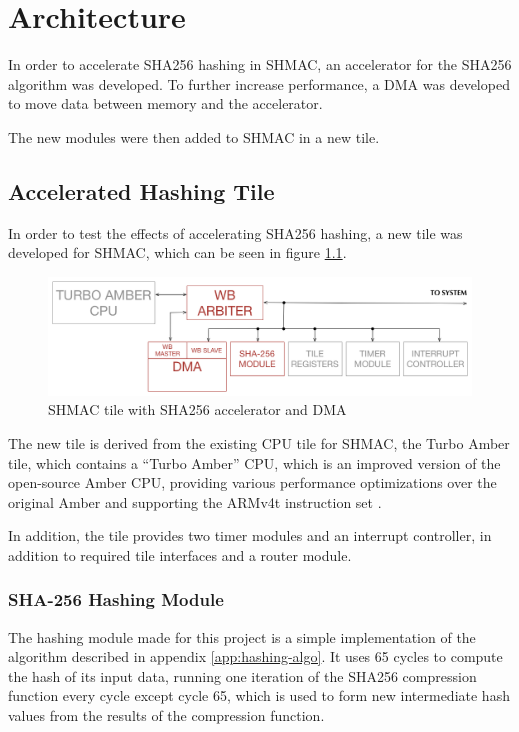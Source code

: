 \chapter{Architecture}
\label{cha:architecture}

In order to accelerate SHA256 hashing in SHMAC, an accelerator for the SHA256 algorithm
was developed. To further increase performance, a DMA was developed to move data between
memory and the accelerator.

The new modules were then added to SHMAC in a new tile.

\section{Accelerated Hashing Tile}

In order to test the effects of accelerating SHA256 hashing, a new tile was developed for
SHMAC, which can be seen in figure \ref{fig:SHA-Tile}.

\begin{figure}[htb]
    \centering
    \includegraphics[width=1.0\textwidth]{Figures/Tile/HashingTile}
    \caption{SHMAC tile with SHA256 accelerator and DMA}
    \label{fig:SHA-Tile}
\end{figure}

The new tile is derived from the existing CPU tile for SHMAC, the Turbo Amber tile, which contains
a ``Turbo Amber'' CPU, which is an improved version of the open-source Amber CPU, providing various
performance optimizations over the original Amber and supporting the ARMv4t instruction set \cite{turboamber}.

In addition, the tile provides two timer modules and an interrupt controller, in addition to required
tile interfaces and a router module.

\subsection{SHA-256 Hashing Module}

The hashing module made for this project is a simple implementation of the algorithm described in
appendix \ref{app:hashing-algo}. It uses 65 cycles to compute the hash of its input data, running
one iteration of the SHA256 compression function every cycle except cycle 65, which is used to
form new intermediate hash values from the results of the compression function.

